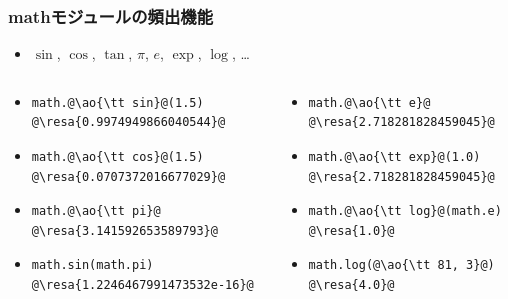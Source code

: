 \documentclass[10pt,dvipdfmx]{beamer}
\newcommand{\ore}[1]{{\color{orange}#1}}
\newcommand{\ao}[1]{{\color{blue}#1}}
\newcommand{\resa}[1]{\ore{\textsl{$\rightarrow$ #1}}}
\begin{document}
\begin{frame}[fragile]
\frametitle{mathモジュールの頻出機能}
\begin{itemize}
\item $\sin$, $\cos$, $\tan$, $\pi$, $e$, $\exp$, $\log$, \ldots
\end{itemize}

\begin{columns}
\begin{column}{0.55\textwidth}
\begin{itemize}
\item
\begin{lstlisting}
math.@\ao{\tt sin}@(1.5)
@\resa{0.9974949866040544}@
\end{lstlisting}

\item
\begin{lstlisting}
math.@\ao{\tt cos}@(1.5)
@\resa{0.0707372016677029}@
\end{lstlisting}

\item
\begin{lstlisting}
math.@\ao{\tt pi}@
@\resa{3.141592653589793}@
\end{lstlisting}

\item
\begin{lstlisting}
math.sin(math.pi)
@\resa{1.2246467991473532e-16}@
\end{lstlisting}

\end{itemize}  
\end{column}
\begin{column}{0.55\textwidth}
\begin{itemize}
\item
\begin{lstlisting}
math.@\ao{\tt e}@
@\resa{2.718281828459045}@
\end{lstlisting}

\item
\begin{lstlisting}
math.@\ao{\tt exp}@(1.0)
@\resa{2.718281828459045}@
\end{lstlisting}

\item
\begin{lstlisting}
math.@\ao{\tt log}@(math.e)
@\resa{1.0}@
\end{lstlisting}

\item
\begin{lstlisting}
math.log(@\ao{\tt 81, 3}@)
@\resa{4.0}@
\end{lstlisting}
\end{itemize}
\end{column}
\end{columns}
\end{frame}
\end{document}

